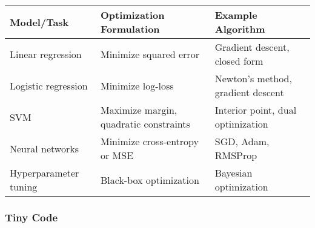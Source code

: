 \documentclass[
  letterpaper,
  DIV=11,
  numbers=noendperiod]{scrreprt}
\begin{document}
\begin{longtable}[]{@{}
  >{\raggedright\arraybackslash}p{}
  >{\raggedright\arraybackslash}p{}
  >{\raggedright\arraybackslash}p{}@{}}
\toprule\noalign{}
\begin{minipage}[b]{\linewidth}\raggedright
Model/Task
\end{minipage} & \begin{minipage}[b]{\linewidth}\raggedright
Optimization Formulation
\end{minipage} & \begin{minipage}[b]{\linewidth}\raggedright
Example Algorithm
\end{minipage} \\
\midrule\noalign{}
\endhead
\bottomrule\noalign{}
\endlastfoot
Linear regression & Minimize squared error & Gradient descent, closed
form \\
Logistic regression & Minimize log-loss & Newton's method, gradient
descent \\
SVM & Maximize margin, quadratic constraints & Interior point, dual
optimization \\
Neural networks & Minimize cross-entropy or MSE & SGD, Adam, RMSProp \\
Hyperparameter tuning & Black-box optimization & Bayesian
optimization \\
\end{longtable}

\subsubsection{Tiny Code}\label{tiny-code-149}
\end{document}
